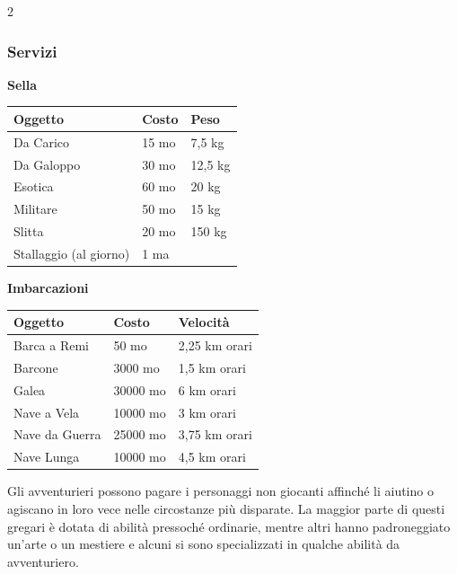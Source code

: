 \begin{multicols}{2}


\subsubsection{Servizi}

\textbf{Sella}

\noindent\begin{tabularx}{\linewidth}{Xll}
\toprule
\rowcolor{gray!20}\textbf{Oggetto}&\textbf{Costo}&\textbf{Peso}\\
\toprule
Da Carico&15 mo&7,5 kg\\
\rowcolor{gray!20}Da Galoppo&30 mo&12,5 kg\\
Esotica&60 mo&20 kg\\
\rowcolor{gray!20}Militare&50 mo&15 kg\\
Slitta&20 mo&150 kg\\
\rowcolor{gray!20}Stallaggio (al giorno)&1 ma&
\end{tabularx}

\medskip

\textbf{Imbarcazioni}\hypertarget{Imbarcazioni}{}

\noindent\begin{tabularx}{\linewidth}{Xll}
\toprule
\rowcolor{gray!20}\textbf{Oggetto}&\textbf{Costo}&\textbf{Velocità}\\
\toprule
Barca a Remi&50 mo&2,25 km orari\\
\rowcolor{gray!20}Barcone&3000 mo&1,5 km orari\\
Galea&30000 mo&6 km orari\\
\rowcolor{gray!20}Nave a Vela&10000 mo&3 km orari\\
Nave da Guerra&25000 mo&3,75 km orari\\
\rowcolor{gray!20}Nave Lunga&10000 mo&4,5 km orari
\end{tabularx}

\medskip

Gli avventurieri possono pagare i personaggi non giocanti affinché li aiutino o agiscano in loro vece nelle circostanze più disparate. La maggior parte di questi gregari è dotata di abilità pressoché ordinarie, mentre altri hanno padroneggiato un'arte o un mestiere e alcuni si sono specializzati in qualche abilità da avventuriero.


\end{multicols}
